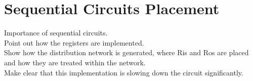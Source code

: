 \section{Sequential Circuits Placement}

Importance of sequential circuits.\\
Point out how the registers are implemented.\\
Show how the distribution network is generated, where Ris and Ros are placed and how they are treated within the network.\\
Make clear that this implementation is slowing down the circuit significantly.